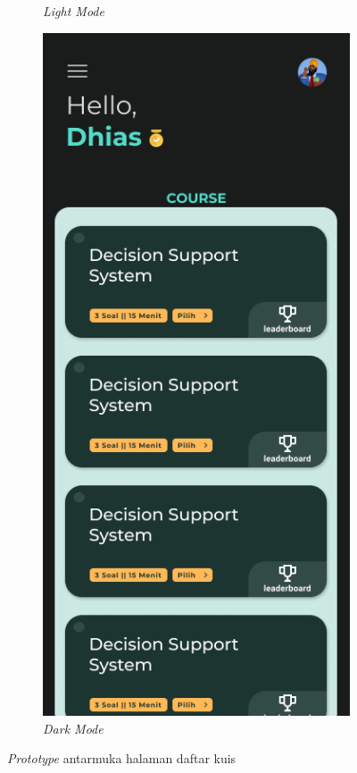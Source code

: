 \begin{figure}[H]
\begin{subfigure}[b]{0.23\textwidth}
	  \caption{\textit{Light Mode}}
	  \label{fig:HasilQuizList}
	\end{subfigure}
	\begin{subfigure}[b]{0.23\textwidth}
		\centering
	  \includegraphics[width=\linewidth]{contents/chapter-3/images/HF-QuizList-dt.png}
	  \caption{\textit{Dark Mode}}
	  \label{fig:HasilQuizList2}
	\end{subfigure}
	\caption{\textit{Prototype} antarmuka halaman daftar kuis}
	\label{Fig:HasilFeatureSetQuizListt}
\end{figure}
